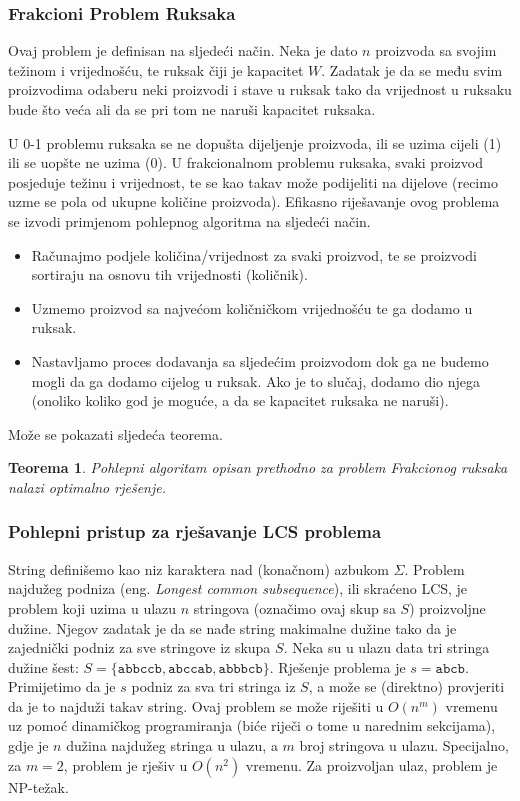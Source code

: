 \documentclass[a4paper, utf8, 11pt, colorlinks]{article}
\newtheorem{thm}{Teorema}
\begin{document}
\subsubsection{Frakcioni Problem Ruksaka}

Ovaj problem je definisan na sljedeći način. Neka je dato $n$ proizvoda sa svojim  težinom i vrijednošću, 
te ruksak čiji je kapacitet $W$. Zadatak je da se među svim proizvodima odaberu neki proizvodi i stave u ruksak tako da vrijednost u ruksaku bude što veća ali da se pri tom ne naruši kapacitet ruksaka.

U 0-1 problemu ruksaka se ne dopušta dijeljenje proizvoda, ili se uzima cijeli (1) ili se uopšte ne uzima (0). U frakcionalnom problemu ruksaka, svaki proizvod posjeduje težinu i vrijednost, te se kao takav može podijeliti na dijelove (recimo uzme se pola od ukupne količine proizvoda). Efikasno riješavanje ovog problema se izvodi primjenom pohlepnog algoritma na sljedeći način. 
\begin{itemize}
	\item Računajmo podjele količina/vrijednost za svaki proizvod, te se proizvodi  sortiraju na osnovu tih vrijednosti (količnik).   \item Uzmemo proizvod sa najvećom količničkom vrijednošću te ga dodamo u ruksak. 
	\item Nastavljamo proces dodavanja sa sljedećim proizvodom dok ga ne budemo mogli da ga  dodamo cijelog u ruksak.    Ako je to slučaj, dodamo dio njega (onoliko koliko god je moguće, a da se kapacitet ruksaka ne naruši). 
\end{itemize}
Može se pokazati sljedeća teorema. 

\begin{thm}
      Pohlepni algoritam opisan prethodno za problem Frakcionog ruksaka nalazi optimalno rješenje.
\end{thm}
\subsubsection{Pohlepni pristup za rješavanje LCS problema}

String definišemo kao niz karaktera nad (konačnom) azbukom $\Sigma$. 
Problem najdužeg podniza (eng. \emph{Longest common subsequence}), ili skraćeno LCS, je problem koji uzima u ulazu  $n$ stringova (označimo ovaj skup sa $S$) proizvoljne dužine. Njegov zadatak je da se nađe string makimalne dužine tako da je  zajednički podniz za sve stringove iz skupa $S$.  Neka su u ulazu data tri stringa dužine šest: $S = \{  \texttt{abbccb}, \texttt{abccab}, \texttt{abbbcb}   \}$. Rješenje problema je $s=\texttt{abcb}$. Primijetimo da je $s$ podniz za sva tri stringa iz $S$, a može se (direktno) provjeriti da je to najduži takav string. 
 Ovaj problem se može riješiti u $O(n^m)$ vremenu uz pomoć dinamičkog programiranja (biće riječi o tome u narednim sekcijama), gdje je $n$ dužina najdužeg stringa u ulazu, a $m$ broj stringova u ulazu. Specijalno, za  $m=2$, problem je rješiv u $O(n^2)$ vremenu. Za proizvoljan ulaz, problem je NP-težak.  
\end{document}
